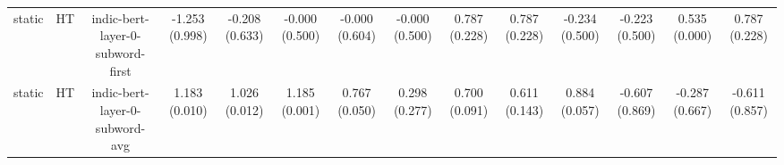 \begin{sidewaystable}[htb]
\begin{tabular}{@{}cccccccccccccc@{}}
        static & HT & indic-bert-layer-0-subword-first & -1.253 (0.998) & -0.208 (0.633) & -0.000 (0.500) & -0.000 (0.604) & -0.000 (0.500) & 0.787 (0.228) & 0.787 (0.228) & -0.234 (0.500) & -0.223 (0.500) & 0.535 (0.000) & 0.787 (0.228) \\
        static & HT & indic-bert-layer-0-subword-avg & 1.183 (0.010) & 1.026 (0.012) & 1.185 (0.001) & 0.767 (0.050) & 0.298 (0.277) & 0.700 (0.091) & 0.611 (0.143) & 0.884 (0.057) & -0.607 (0.869) & -0.287 (0.667) & -0.611 (0.857) \\
        \bottomrule
    \end{tabular}
\end{sidewaystable}